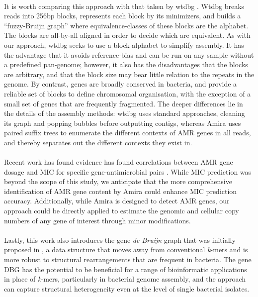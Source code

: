 \paragraph{}
It is worth comparing this approach with that taken by wtdbg \cite{Ruan2020}. Wtdbg breaks reads into 256bp blocks, represents each block by its minimizers, and builds a “fuzzy-Bruijn graph” where equivalence-classes of these blocks are the alphabet. The blocks are all-by-all aligned in order to decide which are equivalent. As with our approach, wtdbg seeks to use a block-alphabet to simplify assembly. It has the advantage that it avoids reference-bias and can be run on any sample without a predefined pan-genome; however, it also has the disadvantages that the blocks are arbitrary, and that the block size may bear little relation to the repeats in the genome. By contrast, genes are broadly conserved in bacteria, and provide a reliable set of blocks to define chromosomal organisation, with the exception of a small set of genes that are frequently fragmented. The deeper differences lie in the details of the assembly methods: wtdbg uses standard approaches, cleaning its graph and popping bubbles before outputting contigs, whereas Amira uses paired suffix trees to enumerate the different contexts of AMR genes in all reads, and thereby separates out the different contexts they exist in.
\paragraph{}
Recent work has found evidence has found correlations between AMR gene dosage and MIC for specific gene-antimicrobial pairs \cite{10.1128/aac.02026-19, 10.1128/AAC.46.10.3334-3336.2002}. While MIC prediction was beyond the scope of this study, we anticipate that the more comprehensive identification of AMR gene content by Amira could enhance MIC prediction accuracy. Additionally, while Amira is designed to detect AMR genes, our approach could be directly applied to estimate the genomic and cellular copy numbers of any gene of interest through minor modifications.
\paragraph{}
Lastly, this work also introduces the gene \textit{de Bruijn} graph that was initially proposed in \cite{pandora}, a data structure that moves away from conventional \textit{k}-mers and is more robust to structural rearrangements that are frequent in bacteria. The gene DBG has the potential to be beneficial for a range of bioinformatic applications in place of \textit{k}-mers, particularly in bacterial genome assembly, and the approach can capture structural heterogeneity even at the level of single bacterial isolates. 

